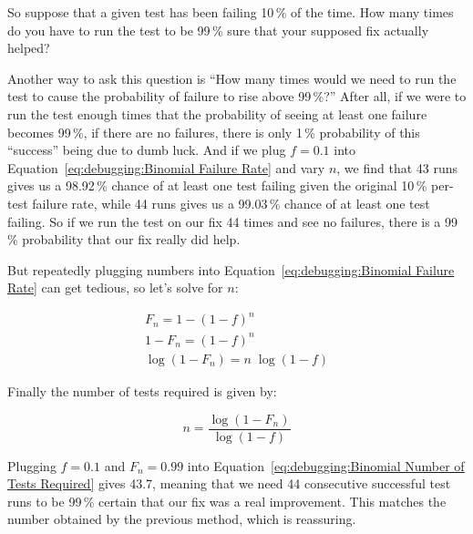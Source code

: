 \QuickQuizEnd

So suppose that a given test has been failing 10\,\% of the time.
How many times do you have to run the test to be 99\,\% sure that
your supposed fix actually helped?

Another way to ask this question is ``How many times would we need
to run the test to cause the probability of failure to rise above 99\,\%?''
After all, if we were to run the test enough times that the probability
of seeing at least one failure becomes 99\,\%, if there are no failures,
there is only 1\,\% probability of this ``success'' being due to dumb luck.
And if we plug $f=0.1$ into
Equation~\ref{eq:debugging:Binomial Failure Rate} and vary $n$,
we find that 43 runs gives us a 98.92\,\% chance of at least one test failing
given the original 10\,\% per-test failure rate,
while 44 runs gives us a 99.03\,\% chance of at least one test failing.
So if we run the test on our fix 44 times and see no failures, there
is a 99\,\% probability that our fix really did help.

But repeatedly plugging numbers into
Equation~\ref{eq:debugging:Binomial Failure Rate}
can get tedious, so let's solve for $n$:

\begin{eqnarray}
	F_n = 1-\left(1-f\right)^n \\
	1 - F_n = \left(1-f\right)^n \\
	\log \left(1 - F_n\right) = n \; \log \left(1 - f\right)
\end{eqnarray}

Finally the number of tests required is given by:

\begin{equation}
	n = \frac{\log\left(1 - F_n\right)}{\log\left(1 - f\right)}
\label{eq:debugging:Binomial Number of Tests Required}
\end{equation}

Plugging $f=0.1$ and $F_n=0.99$ into
Equation~\ref{eq:debugging:Binomial Number of Tests Required}
gives 43.7, meaning that we need 44 consecutive successful test
runs to be 99\,\% certain that our fix was a real improvement.
This matches the number obtained by the previous method, which
is reassuring.

